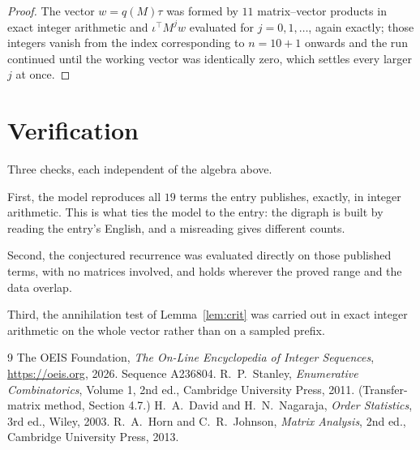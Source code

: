 \documentclass[11pt,a4paper]{article}
\theoremstyle{plain}
\theoremstyle{definition}
\begin{document}
\begin{proof}
The vector $w=q(M)\tau$ was formed by $11$ matrix--vector products in exact integer
arithmetic and $\iota^{\!\top}M^{j}w$ evaluated for $j=0,1,\dots$, again exactly; those
integers vanish from the index corresponding to $n=10+1$ onwards and the run continued
until the working vector was identically zero, which settles every larger $j$ at once.
\end{proof}

\section{Verification}

Three checks, each independent of the algebra above.

First, the model reproduces all $19$ terms the entry publishes, exactly, in integer
arithmetic. This is what ties the model to the entry: the digraph is built by reading the
entry's English, and a misreading gives different counts.

Second, the conjectured recurrence was evaluated directly on those published terms, with no
matrices involved, and holds wherever the proved range and the data overlap.

Third, the annihilation test of Lemma~\ref{lem:crit} was carried out in exact integer
arithmetic on the whole vector rather than on a sampled prefix.

\begin{thebibliography}{9}
 The OEIS Foundation, \emph{The On-Line Encyclopedia of Integer
Sequences}, \url{https://oeis.org}, 2026. Sequence A236804.
 R.~P.~Stanley, \emph{Enumerative Combinatorics}, Volume 1, 2nd ed.,
Cambridge University Press, 2011. (Transfer-matrix method, Section 4.7.)
 H.~A.~David and H.~N.~Nagaraja, \emph{Order Statistics}, 3rd ed., Wiley,
2003.
 R.~A.~Horn and C.~R.~Johnson, \emph{Matrix Analysis}, 2nd ed., Cambridge
University Press, 2013.
\end{thebibliography}
\end{document}
